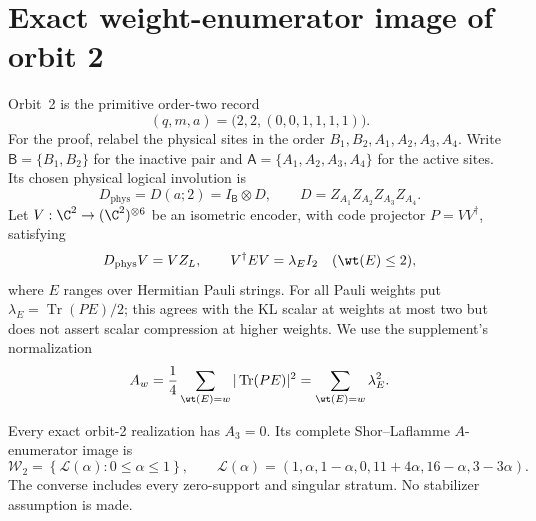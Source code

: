 % 

\section{Exact weight-enumerator image of orbit 2}
\label{o2gc:sec}

Orbit~2 is the primitive order-two record
\[
 (q,m,a)=\bigl(2,2,(0,0,1,1,1,1)\bigr).
\]
For the proof, relabel the physical sites in the order
\(B_1,B_2,A_1,A_2,A_3,A_4\). Write
\(\mathsf B=\{B_1,B_2\}\) for the inactive pair and
\(\mathsf A=\{A_1,A_2,A_3,A_4\}\) for the active sites. Its chosen physical
logical involution is
\begin{equation}
 D_{\mathrm{phys}}=D(a;2)=I_{\mathsf B}\otimes D,
 \qquad D=Z_{A_1}Z_{A_2}Z_{A_3}Z_{A_4}.
 \label{o2gc:record}
\end{equation}
Let \(V:\C^2\to(\C^2)^{\otimes6}\) be an isometric encoder, with
code projector \(P=VV^\dagger\), satisfying
\begin{equation}
 D_{\mathrm{phys}}V=VZ_L,\qquad
 V^\dagger EV=\lambda_EI_2\quad(\wt(E)\le2),
 \label{o2gc:KL}
\end{equation}
where \(E\) ranges over Hermitian Pauli strings. For all Pauli weights
put \(\lambda_E=\operatorname{Tr}(PE)/2\); this agrees with the KL scalar
at weights at most two but does not assert scalar compression at higher
weights. We use the supplement's normalization
\[
 A_w=\frac14\sum_{\wt(E)=w}|\operatorname{Tr}(PE)|^2
     =\sum_{\wt(E)=w}\lambda_E^2.
\]

\begin{theorem}
\label{o2gc:thm-image}
Every exact orbit-2 realization has \(A_3=0\). Its complete
Shor--Laflamme \(A\)-enumerator image is
\begin{equation}
 \boxed{
 \mathcal W_2=
 \left\{\mathcal L(\alpha):0\le\alpha\le1\right\},
 \qquad
 \mathcal L(\alpha)=
 (1,\alpha,1-\alpha,0,11+4\alpha,16-\alpha,3-3\alpha).
 }
 \label{o2gc:image}
\end{equation}
The converse includes every zero-support and singular stratum. No
stabilizer assumption is made.
\end{theorem}

